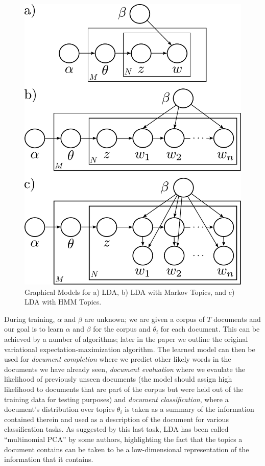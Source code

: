 \documentclass[letterpaper]{article}
\begin{document}
\begin{figure}[h!]
\begin{centering}
    \includegraphics[width=\columnwidth]{./lda_plate_all.pdf}
\par\end{centering}
\caption{Graphical Models for a) LDA, b) LDA with Markov Topics, and c) LDA with HMM Topics.\label{fig:graphical-models}}
\end{figure}

During training, $\alpha$ and $\beta$ are unknown; we are given a corpus of $T$ documents and our goal is to learn $\alpha$ and $\beta$ for the corpus and $\theta_i$ for each document. This can be achieved by a number of algorithms; later in the paper we outline the original variational expectation-maximization algorithm. The learned model can then be used for \textit{document completion} where we predict other likely words in the documents we have already seen, \textit{document evaluation} where we evaulate the likelihood of previously unseen documents (the model should assign high likelihood to documents that are part of the corpus but were held out of the training data for testing purposes) and \textit{document classification}, where a document's distribution over topics $\theta_i$ is taken as a summary of the information contained therein and used as a description of the document for various classification tasks. As suggested by this last task, LDA has been called ``multinomial PCA'' by some authors, highlighting the fact that the topics a document contains can be taken to be a low-dimensional representation of the information that it contains.
\end{document}
